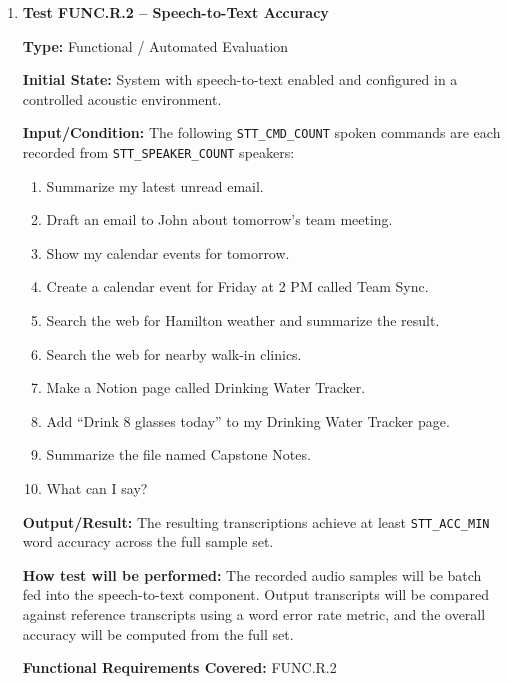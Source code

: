 \documentclass[12pt, titlepage]{article}
\begin{document}
\begin{enumerate}
\textbf{Output/Result:} The system correctly accepts and interprets at
least \texttt{CMD\_ACCEPT\_MIN} of the valid inputs, and each accepted
input is converted into the expected internal command representation and
displayed result.

\textbf{How test will be performed:} Each input and resulting interpreted
command will be logged automatically. The test supervisor will compare
the interpreted result against the expected result for the full command
set and calculate the success rate. Any rejected, misinterpreted, or
malformed results will be recorded for analysis.

\textbf{Functional Requirements Covered:} FUNC.R.1

\item \textbf{Test FUNC.R.2 -- Speech-to-Text Accuracy}

\textbf{Type:} Functional / Automated Evaluation

\textbf{Initial State:} System with speech-to-text enabled and
configured in a controlled acoustic environment.

\textbf{Input/Condition:} The following \texttt{STT\_CMD\_COUNT} spoken
commands are each recorded from \texttt{STT\_SPEAKER\_COUNT} speakers:

{\renewcommand{\labelenumii}{\arabic{enumii}.}
\begin{enumerate}
  \item Summarize my latest unread email.
  \item Draft an email to John about tomorrow's team meeting.
  \item Show my calendar events for tomorrow.
  \item Create a calendar event for Friday at 2 PM called Team Sync.
  \item Search the web for Hamilton weather and summarize the result.
  \item Search the web for nearby walk-in clinics.
  \item Make a Notion page called Drinking Water Tracker.
  \item Add ``Drink 8 glasses today'' to my Drinking Water Tracker page.
  \item Summarize the file named Capstone Notes.
  \item What can I say?
\end{enumerate}
}

\textbf{Output/Result:} The resulting transcriptions achieve at least
\texttt{STT\_ACC\_MIN} word accuracy across the full sample set.

\textbf{How test will be performed:} The recorded audio samples will be
batch fed into the speech-to-text component. Output transcripts will be
compared against reference transcripts using a word error rate metric,
and the overall accuracy will be computed from the full set.

\textbf{Functional Requirements Covered:} FUNC.R.2

\end{enumerate}
\end{document}
